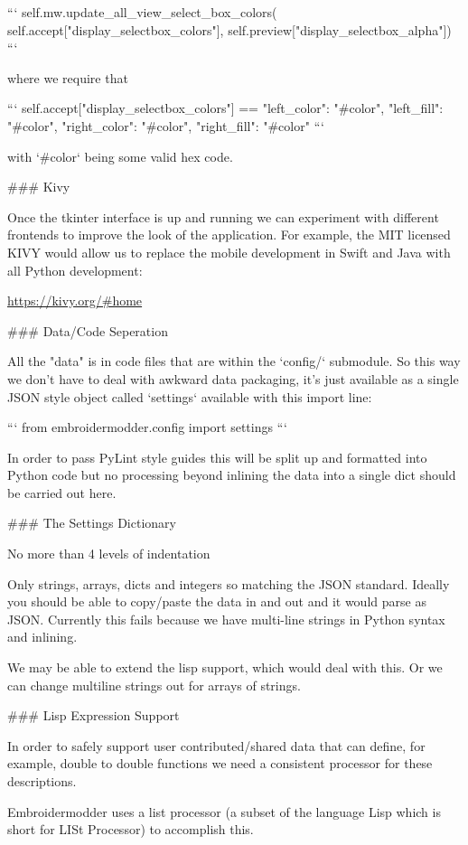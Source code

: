 ```
self.mw.update_all_view_select_box_colors(
self.accept["display_selectbox_colors"],
self.preview["display_selectbox_alpha"])
```

where we require that

```
self.accept["display_selectbox_colors"] == {
    "left_color": "#color",
    "left_fill": "#color",
    "right_color": "#color",
    "right_fill": "#color"
}
```

with `\#color` being some valid hex code.

### Kivy

Once the tkinter interface is up and running we can experiment
with different frontends to improve the look of the application.
For example, the MIT licensed KIVY would allow us to replace the 
mobile development in Swift and Java with all Python development:

\url{https://kivy.org/#home}

### Data/Code Seperation

All the "data" is in code files that are within the `config/`
submodule. So this way we don't have to deal with awkward data
packaging, it's just available as a single JSON style object
called `settings` available with this import line:

```
from embroidermodder.config import settings
```

In order to pass PyLint style guides this will be split up and
formatted into Python code but no processing beyond inlining
the data into a single dict should be carried out here.

### The Settings Dictionary

No more than 4 levels of indentation

Only strings, arrays, dicts and integers so matching the JSON standard. Ideally you should be able to copy/paste the data in and out and it would parse as JSON. Currently this fails because we have multi-line strings in Python syntax and inlining.

We may be able to extend the lisp support, which would deal with this. Or we can change multiline strings out for arrays of strings.

### Lisp Expression Support

In order to safely support user contributed/shared data that can
define, for example, double to double functions we need a consistent
processor for these descriptions.

Embroidermodder uses a list processor (a subset of the language
Lisp which is short for LISt Processor) to accomplish this.

